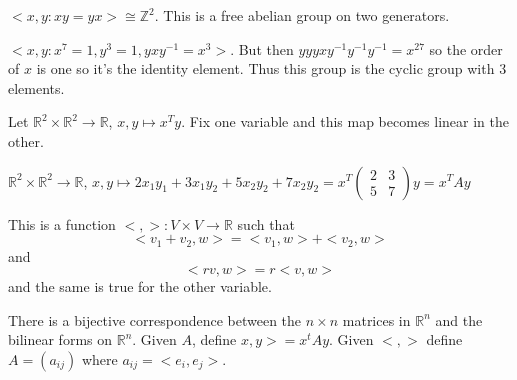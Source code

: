 \documentclass{article}
\newcommand{\R}{\mathbb{R}}
\newcommand{\Z}{\mathbb{Z}}
\newcommand{\ra}[1][]{\xrightarrow{#1}}
\begin{document}
\begin{example}
$<x,y:xy=yx>\cong \Z^2$. This is a free abelian group on two generators.
\end{example}
\begin{example}
$<x,y:x^7=1,y^3=1,yxy^{-1}=x^3>$. But then $yyyxy^{-1}y^{-1}y^{-1}=x^{27}$ so the order of $x$ is one so it's the identity element. Thus this group is the cyclic group with 3 elements.
\end{example}
\begin{example}
Let $\R^2\times\R^2\ra \R$, $x,y\mapsto x^{T}y$. Fix one variable and this map becomes linear in the other.
\end{example}
\begin{example}
$\R^2\times\R^2\ra \R$, $x,y\mapsto 2x_1y_1+3x_1y_2+5x_2y_2+7x_2y_2=x^T\begin{pmatrix}
2&3\\5&7
\end{pmatrix}y=x^TAy$ 
\end{example}
\begin{definition}
This is a function $<,>:V\times V\ra\R$  such that $$<v_1+v_2,w>=<v_1,w>+<v_2,w>$$ and $$<rv,w>=r<v,w>$$ and the same is true for the other variable.
\end{definition}
\begin{proposition}
There is a bijective correspondence between the $n\times n$ matrices in $\R^n$ and the bilinear forms on $\R^n$. Given $A$, define $x,y>=x^tAy$. Given $<,>$ define $A=(a_{ij})$ where $a_{ij}=<e_i,e_j>$.
\end{proposition}
\end{document}
